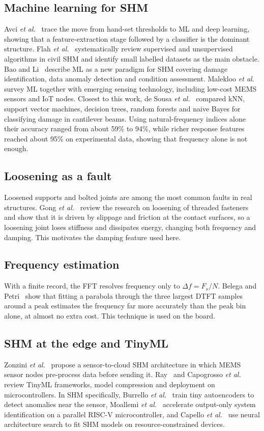 \documentclass[conference]{IEEEtran}
\begin{document}
\subsection{Machine learning for SHM}
Avci \emph{et al.}~\cite{avci2021} trace the move from hand-set thresholds to ML and deep learning, showing that a feature-extraction stage followed by a classifier is the dominant structure. Flah \emph{et al.}~\cite{flah2021} systematically review supervised and unsupervised algorithms in civil SHM and identify small labelled datasets as the main obstacle. Bao and Li~\cite{bao2021} describe ML as a new paradigm for SHM covering damage identification, data anomaly detection and condition assessment. Malekloo \emph{et al.}~\cite{malekloo2022} survey ML together with emerging sensing technology, including low-cost MEMS sensors and IoT nodes. Closest to this work, de Sousa \emph{et al.}~\cite{desousa2023} compared kNN, support vector machines, decision trees, random forests and naive Bayes for classifying damage in cantilever beams. Using natural-frequency indices alone their accuracy ranged from about 59\% to 94\%, while richer response features reached about 95\% on experimental data, showing that frequency alone is not enough.

\subsection{Loosening as a fault}
Loosened supports and bolted joints are among the most common faults in real structures. Gong \emph{et al.}~\cite{gong2022} review the research on loosening of threaded fasteners and show that it is driven by slippage and friction at the contact surfaces, so a loosening joint loses stiffness and dissipates energy, changing both frequency and damping. This motivates the damping feature used here.

\subsection{Frequency estimation}
With a finite record, the FFT resolves frequency only to $\Delta f = F_s/N$. Belega and Petri~\cite{belega2021} show that fitting a parabola through the three largest DTFT samples around a peak estimates the frequency far more accurately than the peak bin alone, at almost no extra cost. This technique is used on the board.

\subsection{SHM at the edge and TinyML}
Zonzini \emph{et al.}~\cite{zonzini2020} propose a sensor-to-cloud SHM architecture in which MEMS sensor nodes pre-process data before sending it. Ray~\cite{ray2022} and Capogrosso \emph{et al.}~\cite{capogrosso2024} review TinyML frameworks, model compression and deployment on microcontrollers. In SHM specifically, Burrello \emph{et al.}~\cite{burrello2022} train tiny autoencoders to detect anomalies near the sensor, Moallemi \emph{et al.}~\cite{moallemi2023} accelerate output-only system identification on a parallel RISC-V microcontroller, and Capello \emph{et al.}~\cite{capello2025} use neural architecture search to fit SHM models on resource-constrained devices.
\end{document}
